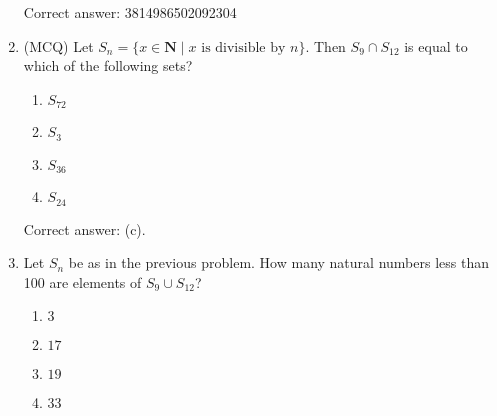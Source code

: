 \documentclass[12pt]{amsart}
\begin{document}
\begin{enumerate}
  Correct answer: 3814986502092304
\item (MCQ) Let $S_n = \{x\in \mathbf N\mid x \text{ is divisible by } n\}$.
  Then $S_9\cap S_{12}$ is equal to which of the following sets?
  \begin{enumerate}
  \item $S_{72}$
  \item $S_3$
  \item $S_{36}$
  \item $S_{24}$
  \end{enumerate}
  Correct answer: (c).
\item Let $S_n$ be as in the previous problem.
  How many natural numbers less than 100 are elements of $S_9\cup S_{12}$?
  \begin{enumerate}
  \item $3$
  \item $17$
  \item $19$
  \item $33$
  \end{enumerate}
\end{enumerate}
\end{document}
